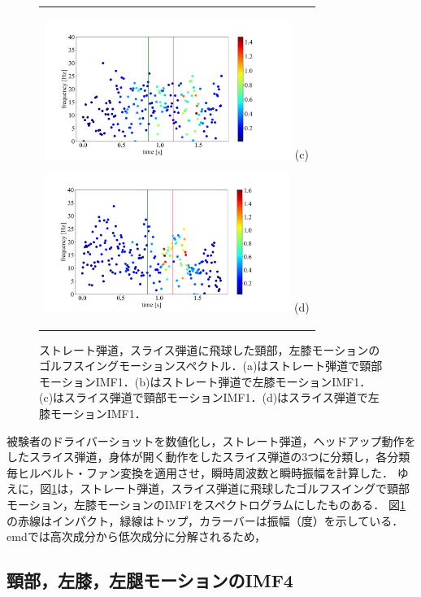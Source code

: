 \begin{figure}
    \begin{center}
        \begin{tabular}{c}
            \begin{minipage}{0.5\hsize}
                \begin{center}
                    \includegraphics[width=8cm]{./images/straight_data/neck/IMF1.png}
                    (c)
                    \label{slice neck imf1}
                \end{center}
            \end{minipage}

            \begin{minipage}{0.5\hsize}
                \begin{center}
                    \includegraphics[width=8cm]{./images/straight_data/left_leg/IMF1.png}
                    (d)
                    \label{slice left leg imf1}
                \end{center}
            \end{minipage}
        \end{tabular}
    \end{center}
    \caption{ストレート弾道，スライス弾道に飛球した頸部，左膝モーションのゴルフスイングモーションスペクトル．(a)はストレート弾道で頸部モーションIMF1．(b)はストレート弾道で左膝モーションIMF1．(c)はスライス弾道で頸部モーションIMF1．(d)はスライス弾道で左膝モーションIMF1．}
    \label{imf1}
\end{figure}

被験者のドライバーショットを数値化し，ストレート弾道，ヘッドアップ動作をしたスライス弾道，身体が開く動作をしたスライス弾道の3つに分類し，各分類毎ヒルベルト・ファン変換を適用させ，瞬時周波数と瞬時振幅を計算した．
ゆえに，図\ref{imf1}は，ストレート弾道，スライス弾道に飛球したゴルフスイングで頸部モーション，左膝モーションのIMF1をスペクトログラムにしたものある．
図\ref{imf1}の赤線はインパクト，緑線はトップ，カラーバーは振幅（度）を示している．
emdでは高次成分から低次成分に分解されるため，


\subsection{頸部，左膝，左腿モーションのIMF4}